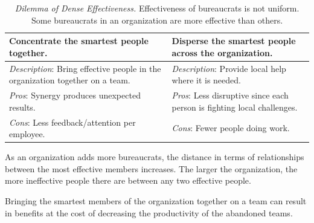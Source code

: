\begin{center}
\begin{table}[H] %
\begin{tabular}{ | m{\dilemmatablewidth}| m{\dilemmatablewidth} | } 
  \hline
  \textbf{Concentrate the smartest people together.} &
  \textbf{Disperse the smartest people across the organization.} \\ 
  \hline
  \textit{Description}: Bring effective people in the organization together on a team. & 
  \textit{Description}: Provide local help where it is needed. \\ 
  \hline
  \textit{Pros}: Synergy produces unexpected results. & 
  \textit{Pros}: Less disruptive since each person is fighting local challenges. \\  
  \hline
  \textit{Cons}: Less feedback/attention per employee. & 
  \textit{Cons}: Fewer people doing work. \\  
  \hline
\end{tabular}
\caption{
\textit{Dilemma of Dense Effectiveness.}
Effectiveness of bureaucrats is not uniform. Some bureaucrats in an organization are more effective than others.
}
\label{table:dilemma-org-dense-effectiveness}
\end{table}
\end{center}


As an organization adds more bureaucrats, the distance in terms of relationships between the most effective members increases.
The larger the organization, the more ineffective people there are between any two effective people. 

Bringing the smartest members of the organization together on a team can result in benefits at the cost of decreasing the productivity of the abandoned teams. 


